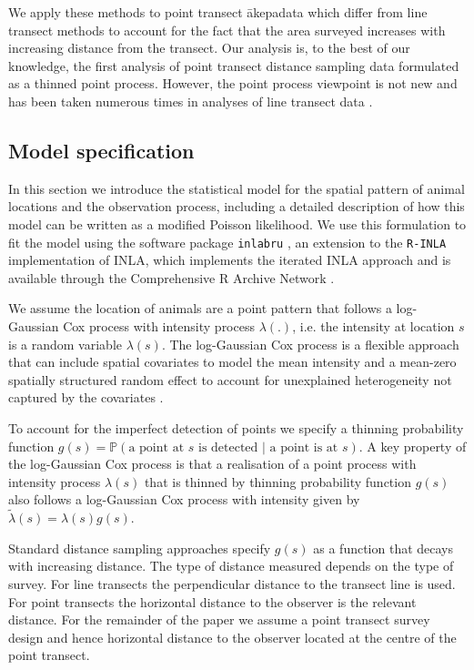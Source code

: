 \documentclass{stylefile16/statsoc}
\newcommand{\tl}{\tilde{\lambda}}   %
\newcommand{\akepa}{\textquotesingle\={a}kepa}  %
\begin{document}
We apply these methods to point transect \akepa data which differ from line transect methods to account for the fact that the area surveyed increases with increasing distance from the transect.  Our analysis is, to the best of our knowledge, the first analysis of point transect distance sampling data formulated as a thinned point process.  However, the point process viewpoint is not new and has been taken numerous times in analyses of line transect data \citep{buckland_model-based_2016, niemi_bayesian_2010, johnson_model-based_2010, waagepetersen_likelihood-based_2006, hedley_spatial_2004,  hogmander_random_1991, stoyan_remark_1982}.

\subsection{Model specification}

In this section we introduce the statistical model for the spatial pattern of animal locations and the observation process, including a detailed description of how this model can be written as a modified Poisson likelihood.  We use this formulation to fit the model using the software package \texttt{inlabru} \citep{bachl_inlabru_2019}, an extension to the \texttt{R-INLA} implementation of INLA, which implements the iterated INLA approach and is available through the Comprehensive R Archive Network \citep{r_2017}.

We assume the location of animals are a point pattern that follows a log-Gaussian Cox process with intensity process $\lambda(.)$, i.e.  the intensity at location $s$ is a random variable $\lambda(s)$.  The log-Gaussian Cox process is a flexible approach that can include spatial covariates to model the mean intensity and a mean-zero spatially structured random effect to account for unexplained heterogeneity not captured by the covariates \citep{moller_log_1998}.

To account for the imperfect detection of points we specify a thinning probability function $g(s) = \mathbb{P}(\text{a point at $s$ is detected | a point is at $s$})$. A key property of the log-Gaussian Cox process is that a realisation of a point process with intensity process $\lambda(s)$ that is thinned by thinning probability function $g(s)$ also follows a log-Gaussian Cox process with intensity given by $\tl(s) = \lambda(s)g(s)$.

Standard distance sampling approaches specify $g(s)$ as a function that decays with increasing distance.  The type of distance measured depends on the type of survey.  For line transects the perpendicular distance to the transect line is used.  For point transects the horizontal distance to the observer is the relevant distance.  For the remainder of the paper we assume a point transect survey design and hence horizontal distance to the observer located at the centre of the point transect.
\end{document}
